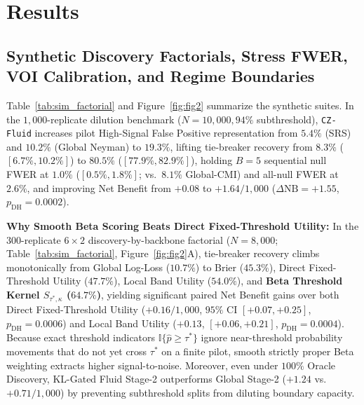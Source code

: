 \documentclass[11pt]{article}
\begin{document}
\section{Results}
\label{sec:results}

\subsection{Synthetic Discovery Factorials, Stress FWER, VOI Calibration, and Regime Boundaries}
\label{sec:res_sim}

Table~\ref{tab:sim_factorial} and Figure~\ref{fig:fig2} summarize the synthetic suites. In the $1{,}000$-replicate dilution benchmark ($N=10{,}000, 94\%$ subthreshold), \texttt{CZ-Fluid} increases pilot High-Signal False Positive representation from $5.4\%$ (SRS) and $10.2\%$ (Global Neyman) to $19.3\%$, lifting tie-breaker recovery from $8.3\%$ ($[6.7\%, 10.2\%]$) to $\mathbf{80.5\%}$ ($[77.9\%, 82.9\%]$), holding $B=5$ sequential null FWER at $\mathbf{1.0\%}$ ($[0.5\%, 1.8\%]$; vs.\ $8.1\%$ Global-CMI) and all-null FWER at $2.6\%$, and improving Net Benefit from $+0.08$ to $\mathbf{+1.64}/1{,}000$ ($\Delta\text{NB}=+1.55$, $p_{\text{DH}}=0.0002$).

\textbf{Why Smooth Beta Scoring Beats Direct Fixed-Threshold Utility:} In the $300$-replicate $6\times 2$ discovery-by-backbone factorial ($N=8{,}000$; Table~\ref{tab:sim_factorial}, Figure~\ref{fig:fig2}A), tie-breaker recovery climbs monotonically from Global Log-Loss ($10.7\%$) to Brier ($45.3\%$), Direct Fixed-Threshold Utility ($47.7\%$), Local Band Utility ($54.0\%$), and \textbf{Beta Threshold Kernel $S_{\tau^*,\kappa}$ ($64.7\%$)}, yielding significant paired Net Benefit gains over both Direct Fixed-Threshold Utility ($\mathbf{+0.16}/1{,}000$, $95\%$ CI $[+0.07, +0.25]$, $p_{\text{DH}}=0.0006$) and Local Band Utility ($+0.13$, $[+0.06, +0.21]$, $p_{\text{DH}}=0.0004$). Because exact threshold indicators $\mathbb{I}\{\hat{p}\ge\tau^*\}$ ignore near-threshold probability movements that do not yet cross $\tau^*$ on a finite pilot, smooth strictly proper Beta weighting extracts higher signal-to-noise. Moreover, even under $100\%$ Oracle Discovery, KL-Gated Fluid Stage-2 outperforms Global Stage-2 ($+1.24$ vs.\ $+0.71/1{,}000$) by preventing subthreshold splits from diluting boundary capacity.
\end{document}
